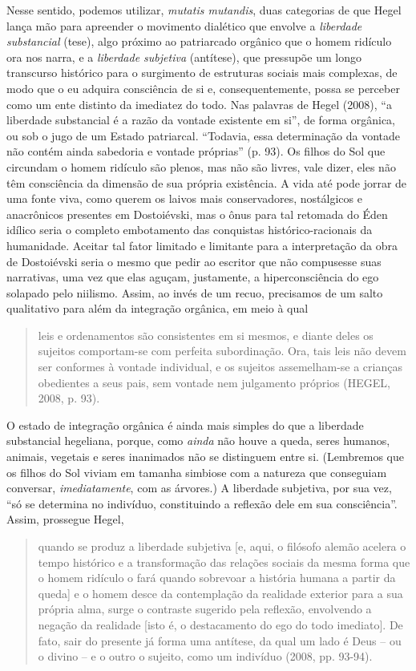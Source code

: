 Nesse sentido, podemos utilizar, \emph{mutatis mutandis}, duas
categorias de que Hegel lança mão para apreender o movimento dialético
que envolve a \emph{liberdade substancial} (tese), algo próximo ao
patriarcado orgânico que o homem ridículo ora nos narra, e a
\emph{liberdade subjetiva} (antítese), que pressupõe um longo transcurso
histórico para o surgimento de estruturas sociais mais complexas, de
modo que o eu adquira consciência de si e, consequentemente, possa se
perceber como um ente distinto da imediatez do todo. Nas palavras de
Hegel (2008), ``a liberdade substancial é a razão da vontade existente
em si'', de forma orgânica, ou sob o jugo de um Estado patriarcal.
``Todavia, essa determinação da vontade não contém ainda sabedoria e
vontade próprias'' (p. 93). Os filhos do Sol que circundam o homem
ridículo são plenos, mas não são livres, vale dizer, eles não têm
consciência da dimensão de sua própria existência. A vida até pode
jorrar de uma fonte viva, como querem os laivos mais conservadores,
nostálgicos e anacrônicos presentes em Dostoiévski, mas o ônus para tal
retomada do Éden idílico seria o completo embotamento das conquistas
histórico-racionais da humanidade. Aceitar tal fator limitado e
limitante para a interpretação da obra de Dostoiévski seria o mesmo que
pedir ao escritor que não compusesse suas narrativas, uma vez que elas
aguçam, justamente, a hiperconsciência do ego solapado pelo niilismo.
Assim, ao invés de um recuo, precisamos de um salto qualitativo para
além da integração orgânica, em meio à qual

\begin{quote}
leis e ordenamentos são consistentes em si mesmos, e diante deles os
sujeitos comportam-se com perfeita subordinação. Ora, tais leis não
devem ser conformes à vontade individual, e os sujeitos assemelham-se a
crianças obedientes a seus pais, sem vontade nem julgamento próprios
(HEGEL, 2008, p. 93).
\end{quote}

O estado de integração orgânica é ainda mais simples do que a liberdade
substancial hegeliana, porque, como \emph{ainda} não houve a queda,
seres humanos, animais, vegetais e seres inanimados não se distinguem
entre si. (Lembremos que os filhos do Sol viviam em tamanha simbiose com
a natureza que conseguiam conversar, \emph{imediatamente}, com as
árvores.) A liberdade subjetiva, por sua vez, ``só se determina no
indivíduo, constituindo a reflexão dele em sua consciência''. Assim,
prossegue Hegel,

\begin{quote}
quando se produz a liberdade subjetiva {[}e, aqui, o filósofo alemão
acelera o tempo histórico e a transformação das relações sociais da
mesma forma que o homem ridículo o fará quando sobrevoar a história
humana a partir da queda{]} e o homem desce da contemplação da realidade
exterior para a sua própria alma, surge o contraste sugerido pela
reflexão, envolvendo a negação da realidade {[}isto é, o destacamento do
ego do todo imediato{]}. De fato, sair do presente já forma uma
antítese, da qual um lado é Deus -- ou o divino -- e o outro o sujeito,
como um indivíduo (2008, pp. 93-94).
\end{quote}

